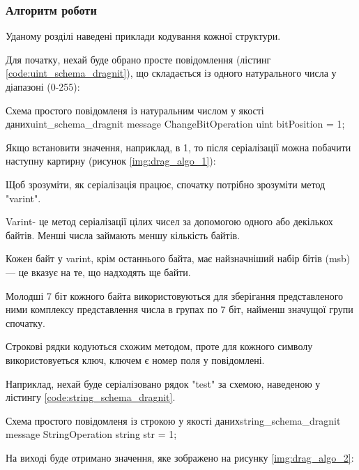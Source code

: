 \documentclass{lib/styles/default-style}
\begin{document}
    \subsubsection{Алгоритм роботи} 

    Уданому розділі наведені приклади кодування кожної структури.

    Для початку, нехай буде обрано просте повідомлення (лістинг \ref{code:uint_schema_dragnit}), що складається із одного натурального числа у діапазоні (0-255):

    \begin{stdout}{Схема простого повідомленя із натуральним числом у якості даних}{uint_schema_dragnit}
        message ChangeBitOperation {
            uint bitPosition = 1;
        }\end{stdout}
    
    Якщо встановити значення, наприклад, в 1, то
    після серіалізації можна побачити наступну картирну (рисунок \ref{img:drag_algo_1}):


    Щоб зрозуміти, як серіалізація працює, спочатку потрібно зрозуміти метод "varint".

    Varint- це метод серіалізації цілих чисел за допомогою одного або декількох байтів.
    Менші числа займають меншу кількість байтів.

    Кожен байт у varint, крім останнього байта, має найзначніший набір бітів (msb) --- це вказує на те,
    що надходять ще байти. 
    
    Молодші 7 біт кожного байта використовуються для зберігання представленого ними комплексу
    представлення числа в групах по 7 біт, найменш значущої групи спочатку.
    
    Строкові рядки кодуються схожим методом, проте для кожного символу використовуеться ключ, ключем є номер поля у повідомлені.

    Наприклад, нехай буде серіалізовано рядок "test" за схемою, наведеною у лістингу \ref{code:string_schema_dragnit}.

    \begin{stdout}{Схема простого повідомленя із строкою у якості даних}{string_schema_dragnit}
        message StringOperation {
            string str = 1;
        }\end{stdout}
    
    На виході буде отримано значення, яке зображено на рисунку \ref{img:drag_algo_2}:
\end{document}
